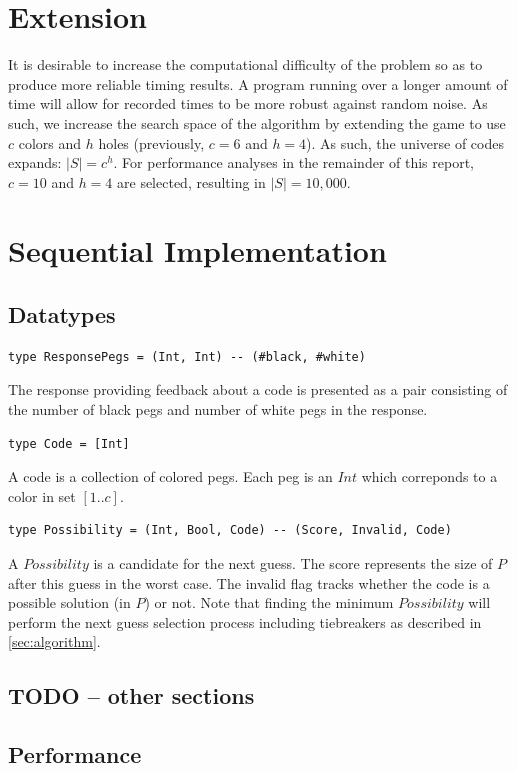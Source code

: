 \documentclass{article}
\begin{document}
\section{Extension}
It is desirable to increase the computational difficulty of the problem so as to produce more reliable timing results. A program running over a longer amount of time will allow for recorded times to be more robust against random noise. As such, we increase the search space of the algorithm by extending the game to use $c$ colors and $h$ holes (previously, $c=6$ and $h=4$). As such, the universe of codes expands: $|S| = c^h$. For performance analyses in the remainder of this report, $c=10$ and $h=4$ are selected, resulting in $|S| = 10,000$.

\section{Sequential Implementation}
\subsection{Datatypes}
\begin{verbatim}
type ResponsePegs = (Int, Int) -- (#black, #white)
\end{verbatim}
The response providing feedback about a code is presented as a pair consisting of the number of black pegs and number of white pegs in the response.

\begin{verbatim}
type Code = [Int]
\end{verbatim}
A code is a collection of colored pegs. Each peg is an $Int$ which correponds to a color in set $[1..c]$.

\begin{verbatim}
type Possibility = (Int, Bool, Code) -- (Score, Invalid, Code)
\end{verbatim}
A $Possibility$ is a candidate for the next guess. The score represents the size of $P$ after this guess in the worst case. The invalid flag tracks whether the code is a possible solution (in $P$) or not. Note that finding the minimum $Possibility$ will perform the next guess selection process including tiebreakers as described in \autoref{sec:algorithm}.

\subsection{TODO -- other sections}
\subsection{Performance}
\end{document}
